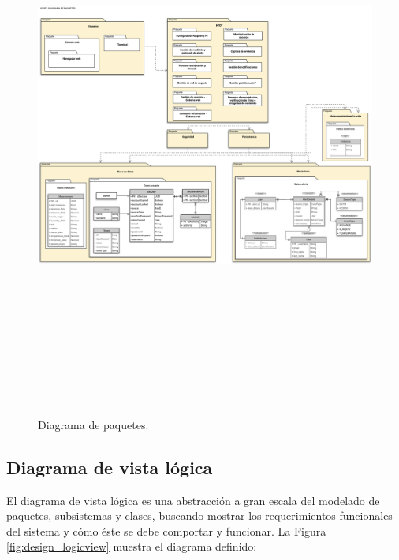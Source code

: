 \documentclass[12pt,a4paper, twoside]{report}
\begin{document}
	\begin{figure}[!ht]   
		\caption{Diagrama de paquetes.} 
		\begin{center} 
			\includegraphics[width=18cm,height=18cm]{Images/design/d_packages} \\
			\label{fig:design_packages} 
		\end{center}  
	\end{figure}	
	
	\newpage
	
	\subsection{Diagrama de vista lógica}
		
	El diagrama de vista lógica es una abstracción a gran escala del modelado de paquetes, subsistemas y clases, buscando mostrar los requerimientos funcionales del sistema y cómo éste se debe comportar y funcionar. La Figura \ref{fig:design_logicview} muestra el diagrama definido: \\
	
\end{document}
